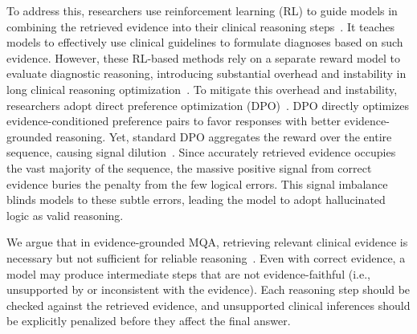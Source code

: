 \documentclass[a4paper,fleqn,doubleblind]{cas-sc}
\begin{document}
To address this, researchers use reinforcement learning (RL) to guide models in combining the retrieved evidence into their clinical reasoning steps~\cite{nakano2021webgpt, zhou2022rainier, ipm2026srcr}.
It teaches models to effectively use clinical guidelines to formulate diagnoses based on such evidence.
However, these RL-based methods rely on a separate reward model to evaluate diagnostic reasoning, introducing substantial overhead and instability in long clinical reasoning optimization~\cite{rafailov2023direct, casper2023open}.
To mitigate this overhead and instability, researchers adopt direct preference optimization (DPO)~\cite{rafailov2023direct, savage2025finetuning, zhu2025mmedpo}.
DPO directly optimizes evidence-conditioned preference pairs to favor responses with better evidence-grounded reasoning.
Yet, standard DPO aggregates the reward over the entire sequence, causing signal dilution~\cite{castricato2024suppressing, tang2024generalized}.
Since accurately retrieved evidence occupies the vast majority of the sequence, the massive positive signal from correct evidence buries the penalty from the few logical errors.
This signal imbalance blinds models to these subtle errors, leading the model to adopt hallucinated logic as valid reasoning.


We argue that in evidence-grounded MQA, retrieving relevant clinical evidence is necessary but not sufficient for reliable reasoning~\cite{adlakha2024evaluating, li2025mdmqa, saadfalcon2024ares, li2026evidencerag, ipm2026s2cr}.
Even with correct evidence, a model may produce intermediate steps that are not evidence-faithful (i.e., unsupported by or inconsistent with the evidence).
Each reasoning step should be checked against the retrieved evidence, and unsupported clinical inferences should be explicitly penalized before they affect the final answer.
\end{document}

